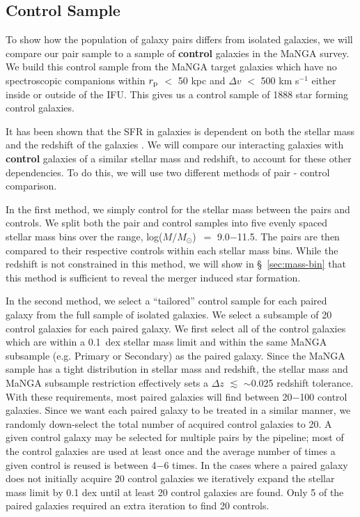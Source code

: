 \documentclass[iop,revtex4,twocolumn,apj,numberedappendix,appendixfloats]{emulateapj}
\newcommand{\logm}{log($M/M_{\odot}$)}
\begin{document}
\subsection{Control Sample}\label{sec:control}

To show how the population of galaxy pairs differs from isolated galaxies, we will compare our pair sample to a sample of \textbf{control} galaxies in the MaNGA survey. We build this control sample from the MaNGA target galaxies which have no spectroscopic companions within $r_{\rm p}$ $<$ 50 kpc and $\Delta v$ $<$ 500 km s$^{-1}$ either inside or outside of the IFU. This gives us a control sample of 1888 star forming control galaxies. 

It has been shown that the SFR in galaxies is dependent on both the stellar mass and the redshift of the galaxies \citep[e.g.,][]{Noeske:2007}. We will compare our interacting galaxies with \textbf{control} galaxies of a similar stellar mass and redshift, to account for these other dependencies. To do this, we will use two different methods of pair - control comparison. 

In the first method, we simply control for the stellar mass between the pairs and controls. We split both the pair and control samples into five evenly spaced stellar mass bins over the range, \logm\ $=$ 9.0$-$11.5. The pairs are then compared to their respective controls within each stellar mass bins. While the redshift is not constrained in this method, we will show in \S~\ref{sec:mass-bin} that this method is sufficient to reveal the merger induced star formation. 

In the second method, we select a ``tailored'' control sample for each paired galaxy from the full sample of isolated galaxies. We select a subsample of 20 control galaxies for each paired galaxy. We first select all of the control galaxies which are within a 0.1~dex stellar mass limit and within the same MaNGA subsample (e.g. Primary or Secondary) as the paired galaxy. Since the MaNGA sample has a tight distribution in stellar mass and redshift, the stellar mass and MaNGA subsample restriction effectively sets a $\Delta z$ $\lesssim$ $\sim$0.025 redshift tolerance. With these requirements, most paired galaxies will find between 20$-$100 control galaxies. Since we want each paired galaxy to be treated in a similar manner, we randomly down-select the total number of acquired control galaxies to 20. A given control galaxy may be selected for multiple pairs by the pipeline; most of the control galaxies are used at least once and the average number of times a given control is reused is between 4$-$6 times. In the cases where a paired galaxy does not initially acquire 20 control galaxies we iteratively expand the stellar mass limit by 0.1 dex until at least 20 control galaxies are found. Only 5 of the paired galaxies required an extra iteration to find 20 controls. 
\end{document}
